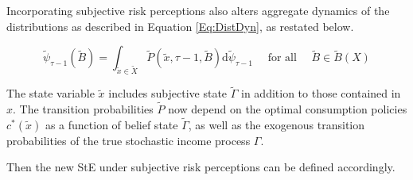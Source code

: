 Incorporating subjective risk perceptions also alters aggregate dynamics of the distributions as described in Equation \ref{Eq:DistDyn}, as restated below. 

\begin{equation}
\label{Eq:DistDynSub}
\tilde \psi_{\tau-1}(\tilde B)=\int_{\tilde x \in \tilde X} \tilde P(\tilde x, \tau-1, \tilde B) \mathrm{d} \tilde \psi_{\tau-1} \quad \text { for all } \quad \tilde B \in \tilde B(X)
\end{equation}

The state variable $\tilde x$ includes subjective state $\tilde \Gamma$ in addition to those contained in $x$. The transition probabilities $\tilde P$ now depend on the optimal consumption policies $c^*(\tilde x)$ as a function of belief state $\tilde \Gamma$, as well as the exogenous transition probabilities of the true stochastic income process $\Gamma$.  

Then the new StE under subjective risk perceptions can be defined accordingly. 

